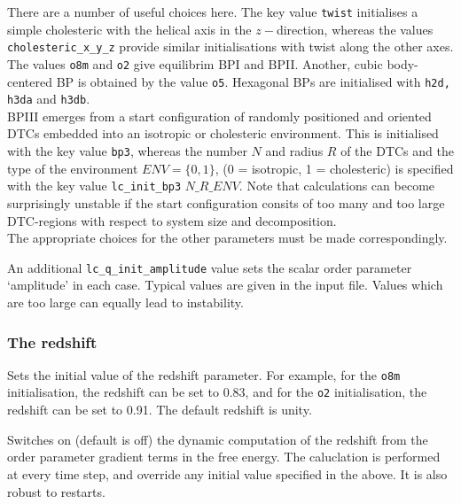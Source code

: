 
There are a number of useful choices here. The key value
\texttt{twist} initialises a simple cholesteric with the
helical axis in the $z-$direction, whereas the values 
\texttt{cholesteric\_x\_y\_z} provide similar initialisations 
with twist along the other axes.
The values \texttt{o8m} and \texttt{o2} give equilibrim BPI and BPII.
Another, cubic body-centered BP is obtained by the value \texttt{o5}.
Hexagonal BPs are initialised with \texttt{h2d, h3da} and \texttt{h3db}.\\
BPIII emerges from a start configuration of randomly positioned 
and oriented DTCs embedded into an isotropic or cholesteric environment.
This is initialised with the key value \texttt{bp3}, whereas the number
$N$ and radius $R$ of the DTCs and the type of the environment 
$ENV=\{0,1\}$, (0 = isotropic, 1 = cholesteric) is specified 
with the key value \texttt{lc\_init\_bp3} $N\_R\_ENV$. 
Note that calculations can become surprisingly unstable if the 
start configuration consits of too many and too large DTC-regions 
with respect to system size and decomposition.\\
The appropriate choices for the other parameters must be made correspondingly.

An additional \texttt{lc\_q\_init\_amplitude} value sets the
scalar order parameter  `amplitude' in each case. Typical
values are given in the input file. Values which are too large can
equally lead to instability.

\subsubsection{The redshift}


Sets the initial value of the redshift parameter. For example,
for the \texttt{o8m} initialisation, the redshift can be set to 0.83,
and for the \texttt{o2} initialisation, the redshift can be set to 0.91.
The default redshift is unity.


Switches on (default is off) the dynamic computation of the redshift
from the order parameter gradient terms in the free energy. The
caluclation is performed at every time step, and override any
initial value specified in the above. It is also robust to restarts.

